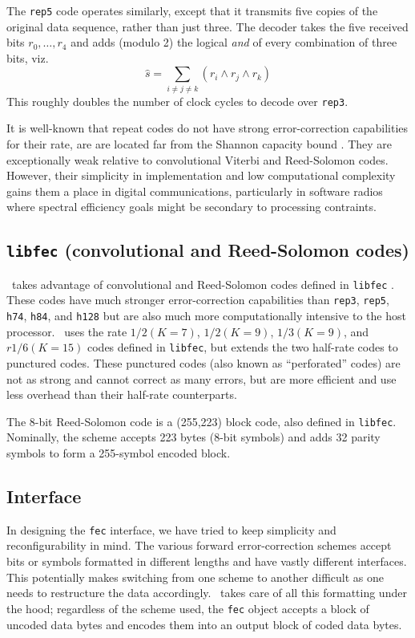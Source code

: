 The {\tt rep5} code operates similarly, except that it transmits five copies
of the original data sequence, rather than just three.
The decoder takes the five received bits $r_0,\ldots,r_4$ and adds (modulo
2) the logical {\it and} of every combination of three bits, viz.
\[
    \hat{s} = \sum_{i\ne j \ne k} {(r_i \land r_j \land r_k)}
\]
This roughly doubles the number of clock cycles to decode over {\tt rep3}.

It is well-known that repeat codes do not have strong error-correction
capabilities for their rate, are are located far from the Shannon capacity
bound \cite{Proakis:2001}.
They are exceptionally weak relative to convolutional Viterbi and Reed-Solomon
codes.
However, their simplicity in implementation and low computational complexity
gains them a place in digital communications, particularly in software radios
where spectral efficiency goals might be secondary to processing contraints.

\subsection{{\tt libfec} (convolutional and  Reed-Solomon codes)}
\label{module:fec:libfecv}
\liquid\ takes advantage of convolutional and Reed-Solomon codes defined in
{\tt libfec} \cite{libfec:web}.
These codes have much stronger error-correction capabilities than {\tt rep3},
{\tt rep5}, {\tt h74}, {\tt h84}, and {\tt h128}
but are also much more computationally intensive to the host processor.
\liquid\ uses the rate $1/2 (K=7)$, $1/2 (K=9)$, $1/3 (K=9)$, and
$r1/6 (K=15)$ codes defined in {\tt libfec}, but extends the two half-rate
codes to punctured codes.
These punctured codes (also known as ``perforated'' codes) are not as strong
and cannot correct as many errors, but are more efficient and use less
overhead than their half-rate counterparts.

The 8-bit Reed-Solomon code is a (255,223) block code, also defined in
{\tt libfec}.
Nominally, the scheme accepts 223 bytes (8-bit symbols) and adds 32 parity
symbols to form a 255-symbol encoded block.

\subsection{Interface}
\label{module:fec:interface}
In designing the {\tt fec} interface, we have tried to keep simplicity and
reconfigurability in mind.
The various forward error-correction schemes accept bits or symbols
formatted in different lengths and have vastly different interfaces.
This potentially makes switching from one scheme to another difficult as one
needs to restructure the data accordingly.
\liquid\ takes care of all this formatting under the hood; regardless of the
scheme used, the {\tt fec} object accepts a block of uncoded data bytes and
encodes them into an output block of coded data bytes.

